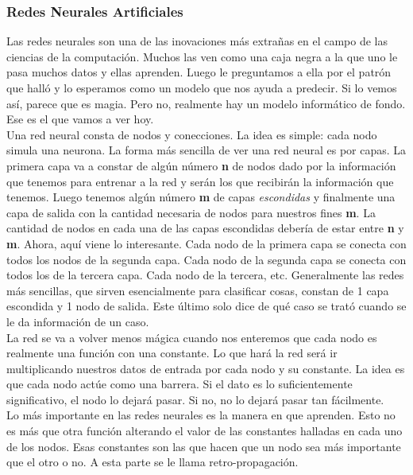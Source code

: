 \documentclass[10pt,letterpaper]{article}
\begin{document}
\subsubsection{Redes Neurales Artificiales}
Las redes neurales son una de las inovaciones m\'as extra\~nas en el campo de las ciencias de la computaci\'on. Muchos las ven como una caja negra a la que uno le pasa muchos datos y ellas aprenden. Luego le preguntamos a ella por el patr\'on que hall\'o y lo esperamos como un modelo que nos ayuda a predecir. Si lo vemos as\'i, parece que es magia. Pero no, realmente hay un modelo inform\'atico de fondo. Ese es el que vamos a ver hoy.\\

Una red neural consta de nodos y conecciones. La idea es simple: cada nodo simula una neurona. La forma m\'as sencilla de ver una red neural es por capas. La primera capa va a constar de alg\'un n\'umero \textbf{n} de nodos dado por la informaci\'on que tenemos para entrenar a la red y ser\'an los que recibir\'an la informaci\'on que tenemos. Luego tenemos alg\'un n\'umero \textbf{m} de capas \emph{escondidas} y finalmente una capa de salida con la cantidad necesaria de nodos para nuestros fines \textbf{m}. La cantidad de nodos en cada una de las capas escondidas deber\'ia de estar entre \textbf{n} y \textbf{m}. Ahora, aqu\'i viene lo interesante. Cada nodo de la primera capa se conecta con todos los nodos de la segunda capa. Cada nodo de la segunda capa se conecta con todos los de la tercera capa. Cada nodo de la tercera, etc. Generalmente las redes m\'as sencillas, que sirven esencialmente para clasificar cosas, constan de 1 capa escondida y 1 nodo de salida. Este \'ultimo solo dice de qu\'e caso se trat\'o cuando se le da informaci\'on de un caso.\\

La red se va a volver menos m\'agica cuando nos enteremos que cada nodo es realmente una funci\'on con una constante. Lo que har\'a la red ser\'a ir multiplicando nuestros datos de entrada por cada nodo y su constante. La idea es que cada nodo act\'ue como una barrera. Si el dato es lo suficientemente significativo, el nodo lo dejar\'a pasar. Si no, no lo dejar\'a pasar tan f\'acilmente.\\

Lo m\'as importante en las redes neurales es la manera en que aprenden. Esto no es m\'as que otra funci\'on alterando el valor de las constantes halladas en cada uno de los nodos. Esas constantes son las que hacen que un nodo sea m\'as importante que el otro o no. A esta parte se le llama retro-propagaci\'on.\\
\end{document}
